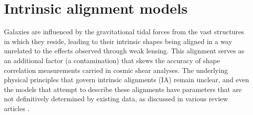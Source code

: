 \section{Intrinsic alignment models}
 \label{sec:IA_th}

 
Galaxies are influenced by the gravitational tidal forces from the vast structures in which they reside, leading to their intrinsic shapes being aligned in a way unrelated to the effects observed through weak lensing.
This alignment serves as an additional factor (a contamination) that skews the accuracy of shape correlation measurements carried in cosmic shear analyses.
The underlying physical principles that govern intrinsic alignments (IA) remain unclear, and even the models that attempt to describe these alignments have parameters that are not definitively determined by existing data, as discussed in various review articles \citep[see][for reviews]{Joachimi_IA_review_2015, Kirk_IA_review_2015, Troxel_IA_review_2015, Kiessling_IA_review_2015}.
 
